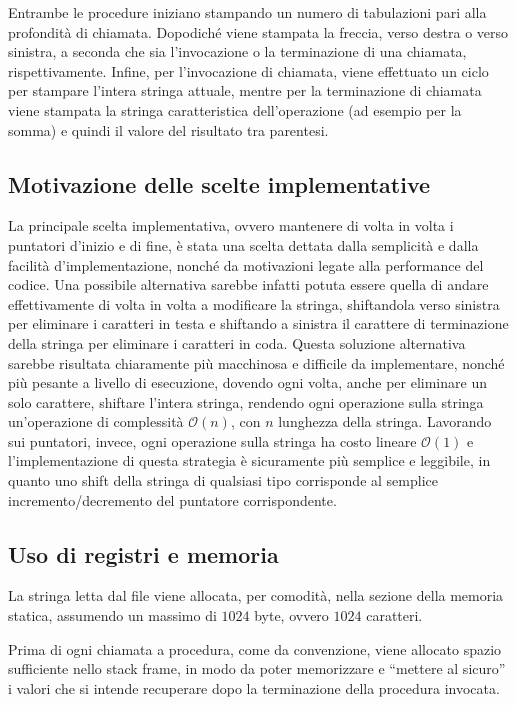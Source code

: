 		Entrambe le procedure iniziano stampando un numero di tabulazioni pari alla profondità di chiamata. Dopodiché viene stampata la freccia, verso destra o verso sinistra, a seconda che sia l'invocazione o la terminazione di una chiamata, rispettivamente. Infine, per l'invocazione di chiamata, viene effettuato un ciclo per stampare l'intera stringa attuale, mentre per la terminazione di chiamata viene stampata la stringa caratteristica dell'operazione (ad esempio  per la somma) e quindi il valore del risultato tra parentesi.
		
	\subsection*{Motivazione delle scelte implementative}
		La principale scelta implementativa, ovvero mantenere di volta in volta i puntatori d'inizio e di fine, è stata una scelta dettata dalla semplicità e dalla facilità d'implementazione, nonché da motivazioni legate alla performance del codice. Una possibile alternativa sarebbe infatti potuta essere quella di andare effettivamente di volta in volta a modificare la stringa, shiftandola verso sinistra per eliminare i caratteri in testa e shiftando a sinistra il carattere di terminazione della stringa per eliminare i caratteri in coda. Questa soluzione alternativa sarebbe risultata chiaramente più macchinosa e difficile da implementare, nonché più pesante a livello di esecuzione, dovendo ogni volta, anche per eliminare un solo carattere, shiftare l'intera stringa, rendendo ogni operazione sulla stringa un'operazione di complessità $\mathcal{O}(n)$, con $n$ lunghezza della stringa. Lavorando sui puntatori, invece, ogni operazione sulla stringa ha costo lineare $\mathcal{O}(1)$ e l'implementazione di questa strategia è sicuramente più semplice e leggibile, in quanto uno shift della stringa di qualsiasi tipo corrisponde al semplice incremento/decremento del puntatore corrispondente.
	
	\subsection*{Uso di registri e memoria}
        La stringa letta dal file viene allocata, per comodità, nella sezione della memoria statica, assumendo un massimo di $1024$ byte, ovvero $1024$ caratteri.
		
		Prima di ogni chiamata a procedura, come da convenzione, viene allocato spazio sufficiente nello stack frame, in modo da poter memorizzare e ``mettere al sicuro'' i valori che si intende recuperare dopo la terminazione della procedura invocata.
		
